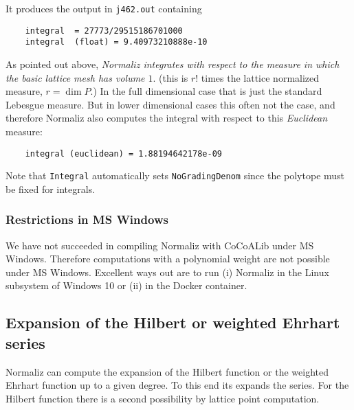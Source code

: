 \documentclass[12pt,a4paper]{scrartcl}
\theoremstyle{definition}
\def\ttt{\texttt}
\begin{document}
{	It produces the output in \ttt{j462.out} containing
	
	\begin{Verbatim}
	integral  = 27773/29515186701000
	integral  (float) = 9.40973210888e-10
	\end{Verbatim}
	
	As pointed out above, \emph{Normaliz integrates with respect to the measure in which the basic lattice mesh has volume $1$}. (this is $r!$ times the lattice normalized measure, $r=\dim P$.) In the full dimensional case that is just the standard Lebesgue measure. But in lower dimensional cases this often not the case, and therefore Normaliz also computes the integral with respect to this \emph{Euclidean} measure:
	\begin{Verbatim}
	integral (euclidean) = 1.88194642178e-09
	\end{Verbatim}
	
	Note that \verb|Integral| automatically sets \verb|NoGradingDenom| since the polytope must be fixed for integrals. 
	
	\subsubsection{Restrictions in MS Windows}
	
	We have not succeeded in compiling Normaliz with CoCoALib under MS Windows. Therefore computations with a polynomial weight are not possible under MS Windows.
	Excellent ways out are  to run (i) Normaliz in the Linux subsystem of Windows 10 or (ii) in the Docker container.
	
	\subsection{Expansion of the Hilbert or weighted Ehrhart series}\label{expansion}
	
	Normaliz can compute the expansion of the Hilbert function or the weighted Ehrhart function up to a given degree. To this end its expands the series. For the Hilbert function there is a second possibility by lattice point computation.
	
}
\end{document}
